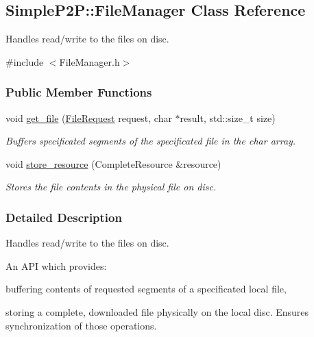 \hypertarget{classSimpleP2P_1_1FileManager}{}\subsection{Simple\+P2P\+:\+:File\+Manager Class Reference}
\label{classSimpleP2P_1_1FileManager}


Handles read/write to the files on disc.  




{\ttfamily \#include $<$File\+Manager.\+h$>$}

\subsubsection*{Public Member Functions}
\begin{DoxyCompactItemize}
\item 
void \hyperlink{classSimpleP2P_1_1FileManager_a9f3fd7a6b4c695b79258448dc60b0b66}{get\+\_\+file} (\hyperlink{classSimpleP2P_1_1FileRequest}{File\+Request} request, char $\ast$result, std\+::size\+\_\+t size)
\begin{DoxyCompactList}\small\item\em Buffers specificated segments of the specificated file in the char array. \end{DoxyCompactList}\item 
void \hyperlink{classSimpleP2P_1_1FileManager_a6bc1cab4cfac8c75186147b9bf1f29e3}{store\+\_\+resource} (Complete\+Resource \&resource)
\begin{DoxyCompactList}\small\item\em Stores the file contents in the physical file on disc. \end{DoxyCompactList}\end{DoxyCompactItemize}


\subsubsection{Detailed Description}
Handles read/write to the files on disc. 

An A\+PI which provides\+:
\begin{DoxyItemize}
\item buffering contents of requested segments of a specificated local file,
\item storing a complete, downloaded file physically on the local disc. Ensures synchronization of those operations. 
\end{DoxyItemize}

